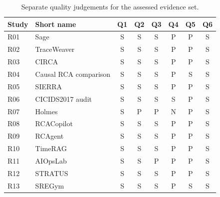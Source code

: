 \begin{table}[htbp]
\centering\small
\caption{Separate quality judgements for the assessed evidence set.}
\label{tab:slr:quality}
\begin{tabular}{@{}llcccccc@{}}
\toprule
Study & Short name & Q1 & Q2 & Q3 & Q4 & Q5 & Q6 \\
\midrule
R01 & Sage & S & S & S & P & P & S \\
R02 & TraceWeaver & S & S & S & P & P & S \\
R03 & CIRCA & S & S & S & P & P & S \\
R04 & Causal RCA comparison & S & S & S & P & S & S \\
R05 & SIERRA & S & S & S & P & P & S \\
R06 & CICIDS2017 audit & S & S & S & S & P & S \\
R07 & Holmes & S & P & P & N & P & S \\
R08 & RCACopilot & S & S & S & P & P & S \\
R09 & RCAgent & S & S & S & P & P & S \\
R10 & TimeRAG & S & S & S & P & P & S \\
R11 & AIOpsLab & S & S & P & P & P & S \\
R12 & STRATUS & S & S & S & P & P & S \\
R13 & SREGym & S & S & S & P & S & S \\
\bottomrule
\end{tabular}
\end{table}
